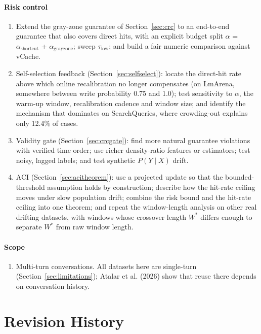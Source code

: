 \documentclass[11pt]{article}
\newcommand{\taulow}{\ensuremath{\tau_{\text{low}}}}
\begin{document}
\paragraph{Risk control}
\begin{enumerate}[leftmargin=*,resume]
  \item Extend the gray-zone guarantee of Section~\ref{sec:crc} to an end-to-end guarantee that also covers direct hits, with an explicit budget split $\alpha$ = $\alpha_{\text{shortcut}}$ + $\alpha_{\text{grayzone}}$; sweep \taulow{}; and build a fair numeric comparison against vCache.
  \item Self-selection feedback (Section~\ref{sec:selfselect}): locate the direct-hit rate above which online recalibration no longer compensates (on LmArena, somewhere between write probability 0.75 and 1.0); test sensitivity to $\alpha$, the warm-up window, recalibration cadence and window size; and identify the mechanism that dominates on SearchQueries, where crowding-out explains only 12.4\% of cases.
  \item Validity gate (Section~\ref{sec:crcgate}): find more natural guarantee violations with verified time order; use richer density-ratio features or estimators; test noisy, lagged labels; and test synthetic $P(Y\mid X)$ drift.
  \item ACI (Section~\ref{sec:acitheorem}): use a projected update so that the bounded-threshold assumption holds by construction; describe how the hit-rate ceiling moves under slow population drift; combine the risk bound and the hit-rate ceiling into one theorem; and repeat the window-length analysis on other real drifting datasets, with windows whose crossover length $W^*$ differs enough to separate $W^*$ from raw window length.
\end{enumerate}

\paragraph{Scope}
\begin{enumerate}[leftmargin=*,resume]
  \item Multi-turn conversations. All datasets here are single-turn (Section~\ref{sec:limitations}); Atalar et al. (2026) show that reuse there depends on conversation history.
\end{enumerate}

\section*{Revision History}
\end{document}
